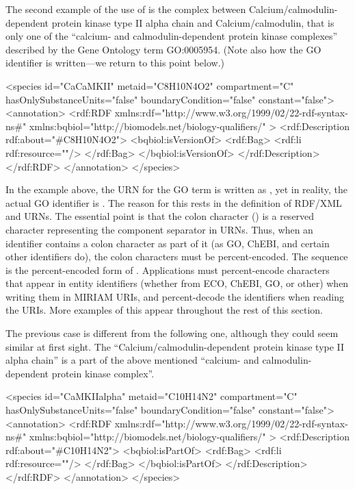 The second example of the use of  is the
complex between Calcium/calmodulin-dependent protein kinase type
II alpha chain and Calcium/calmodulin, that is only one of the
``calcium- and calmodulin-dependent protein kinase complexes''
described by the Gene Ontology term GO:0005954.  (Note also how
the GO identifier is written---we return to this point below.)

\begin{example}
<species id="CaCaMKII" metaid="C8H10N4O2" compartment="C"
         hasOnlySubstanceUnits="false" boundaryCondition="false"
         constant="false">
  <annotation>
    <rdf:RDF
      xmlns:rdf="http://www.w3.org/1999/02/22-rdf-syntax-ns\#"
      xmlns:bqbiol="http://biomodels.net/biology-qualifiers/"
    >
      <rdf:Description rdf:about="\#C8H10N4O2">
        <bqbiol:isVersionOf>
          <rdf:Bag>
            <rdf:li rdf:resource="\!"/>
          </rdf:Bag>
        </bqbiol:isVersionOf>
      </rdf:Description>
    </rdf:RDF>
  </annotation>
</species>
\end{example}

In the example above, the URN for the GO term is written as
, yet in reality, the actual GO identifier is
.  The reason for this rests in the definition
of RDF/XML and URNs.  The essential point is that the colon
character (\val{:}) is a reserved character representing the
component separator in URNs.  Thus, when an identifier contains a
colon character as part of it (as GO, ChEBI, and certain other
identifiers do), the colon characters must be percent-encoded.
The sequence  is the percent-encoded form of \val{:}.
Applications must percent-encode \val{:} characters that appear in
entity identifiers (whether from ECO, ChEBI, GO, or other) when
writing them in MIRIAM URIs, and percent-decode the identifiers
when reading the URIs.  More examples of this appear throughout
the rest of this section.

The previous case is different from the following one, although they
could seem similar at first sight. The
``Calcium/calmodulin-dependent protein kinase type II alpha
chain'' is a part of the above mentioned ``calcium- and
calmodulin-dependent protein kinase complex''.

\begin{example}
<species id="CaMKIIalpha" metaid="C10H14N2" compartment="C"
         hasOnlySubstanceUnits="false" boundaryCondition="false"
         constant="false">
  <annotation>
    <rdf:RDF
      xmlns:rdf="http://www.w3.org/1999/02/22-rdf-syntax-ns\#"
      xmlns:bqbiol="http://biomodels.net/biology-qualifiers/"
    >
      <rdf:Description rdf:about="\#C10H14N2">
        <bqbiol:isPartOf>
          <rdf:Bag>
            <rdf:li rdf:resource="\!"/>
          </rdf:Bag>
        </bqbiol:isPartOf>
      </rdf:Description>
    </rdf:RDF>
  </annotation>
</species>
\end{example}

